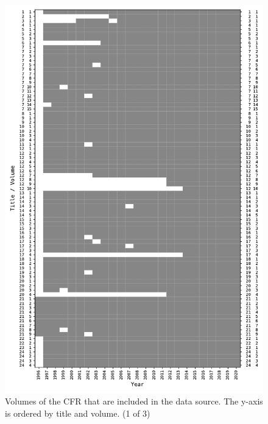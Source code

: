 \documentclass[utf8,sort&compress,numbers,square,table,hidelinks]{frontiers_suppmat} %
\begin{document}
\begin{figure}
	\centering
	\includegraphics[height=0.9\textheight]{figure_si_cfr_inputs-0}
	\caption{Volumes of the CFR that are included in the data source. The y-axis is ordered by title and volume. (1 of 3)}\label{fig:missing-cfr-volumes-1}
\end{figure}
\end{document}
